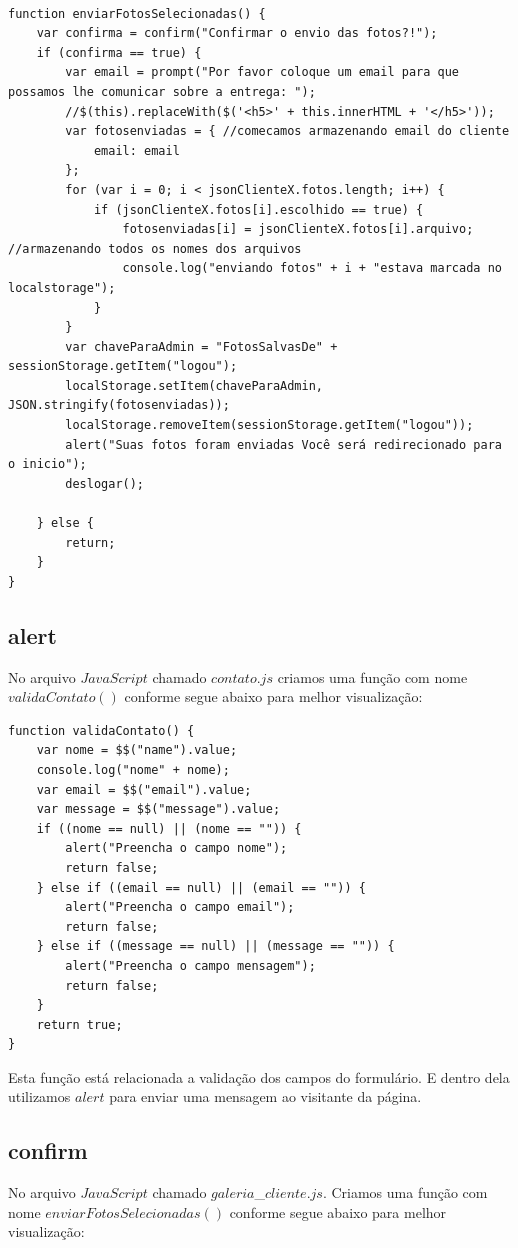 \begin{lstlisting}

function enviarFotosSelecionadas() {
    var confirma = confirm("Confirmar o envio das fotos?!");
    if (confirma == true) {
        var email = prompt("Por favor coloque um email para que possamos lhe comunicar sobre a entrega: ");
        //$(this).replaceWith($('<h5>' + this.innerHTML + '</h5>'));
        var fotosenviadas = { //comecamos armazenando email do cliente
            email: email
        };
        for (var i = 0; i < jsonClienteX.fotos.length; i++) {
            if (jsonClienteX.fotos[i].escolhido == true) {
                fotosenviadas[i] = jsonClienteX.fotos[i].arquivo; //armazenando todos os nomes dos arquivos
                console.log("enviando fotos" + i + "estava marcada no localstorage");
            }
        }
        var chaveParaAdmin = "FotosSalvasDe" + sessionStorage.getItem("logou");
        localStorage.setItem(chaveParaAdmin, JSON.stringify(fotosenviadas));
        localStorage.removeItem(sessionStorage.getItem("logou"));
        alert("Suas fotos foram enviadas Você será redirecionado para o inicio");
        deslogar();

    } else {
        return;
    }
}
\end{lstlisting}

\subsection{alert}

	No arquivo $JavaScript$ chamado $contato.js$ criamos uma função com nome $validaContato()$ conforme segue abaixo para melhor visualização:
	
\begin{lstlisting}
function validaContato() {
    var nome = $$("name").value;
    console.log("nome" + nome);
    var email = $$("email").value;
    var message = $$("message").value;
    if ((nome == null) || (nome == "")) {
        alert("Preencha o campo nome");
        return false;
    } else if ((email == null) || (email == "")) {
        alert("Preencha o campo email");
        return false;
    } else if ((message == null) || (message == "")) {
        alert("Preencha o campo mensagem");
        return false;
    }
    return true;
}
\end{lstlisting}
	Esta função está relacionada a validação dos campos do formulário. E dentro dela utilizamos $alert$ para enviar uma mensagem ao visitante da página.

\subsection{confirm}
	No arquivo $JavaScript$ chamado $galeria$\_$cliente.js$.
	Criamos uma função com nome $enviarFotosSelecionadas()$ conforme segue abaixo para melhor visualização:
	
